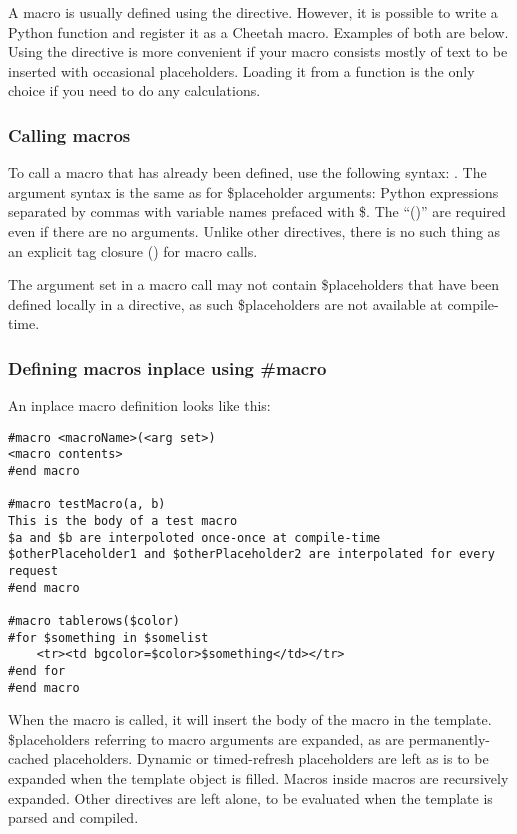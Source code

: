 A macro is usually defined using the  directive.  However, it is
possible to write a Python function and register it as a Cheetah macro.
Examples of both are below.  Using the  directive is more
convenient if your macro consists mostly of text to be inserted with occasional
placeholders.  Loading it from a function is the only choice if you need to do
any calculations.


\subsubsection{Calling macros}
\label{directives.macros.calling}

To call a macro that has already been defined, use the following syntax:
.  The argument syntax is the same as for
\$placeholder arguments: Python expressions separated by commas with variable
names prefaced with \$.  The ``()'' are required even if there are no arguments.
Unlike other directives, there is no such thing as an explicit tag closure
(\code{\/\#}) for macro calls.

The argument set in a macro call may not contain \$placeholders that have been
defined locally in a  directive, as such \$placeholders are not
available at compile-time.


\subsubsection{Defining macros inplace using \#macro}
\label{directives.macros.defining}

An inplace macro definition looks like this:

\begin{verbatim}
#macro <macroName>(<arg set>)
<macro contents>
#end macro

#macro testMacro(a, b)
This is the body of a test macro
$a and $b are interpoloted once-once at compile-time
$otherPlaceholder1 and $otherPlaceholder2 are interpolated for every request
#end macro

#macro tablerows($color)
#for $something in $somelist
    <tr><td bgcolor=$color>$something</td></tr>
#end for
#end macro
\end{verbatim}

When the macro is called, it will insert the body of the macro in the template.
\$placeholders referring to macro arguments are expanded, as are
permanently-cached placeholders.  Dynamic or timed-refresh placeholders are left
as is to be expanded when the template object is filled.  Macros inside macros are
recursively expanded.  Other directives are left alone, to be evaluated when the
template is parsed and compiled.

